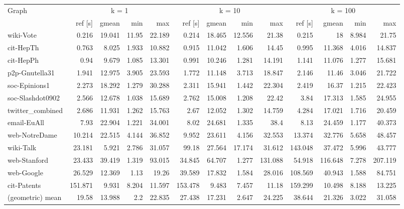 \begin{landscape}

\begin{table}[h]
\centering
\begin{tabular}{l|rrrr|rrrr|rrrr}
\toprule
Graph & \multicolumn{4}{c|}{k = 1} & \multicolumn{4}{c|}{k = 10} & \multicolumn{4}{c}{k = 100}\\
                &     ref [s] &   gmean &   min &     max &     ref [s] &   gmean &   min &     max &     ref [s] &   gmean &   min &     max \\
\midrule \midrule
 wiki-Vote        &   0.216 &  19.041 & 11.95  & 22.189 &   0.214 &  18.465 & 12.556 &  21.38  &   0.215 &  18     & 8.984 &  21.75  \\
 cit-HepTh        &   0.763 &   8.025 &  1.933 & 10.882 &   0.915 &  11.042 &  1.606 &  14.45  &   0.995 &  11.368 & 4.016 &  14.837 \\
 cit-HepPh        &   0.94  &   9.679 &  1.085 & 13.301 &   0.991 &  10.246 &  1.281 &  14.191 &   1.141 &  11.076 & 1.277 &  15.681 \\
 p2p-Gnutella31   &   1.941 &  12.975 &  3.905 & 23.593 &   1.772 &  11.148 &  3.713 &  18.847 &   2.146 &  11.46  & 3.046 &  21.722 \\
 soc-Epinions1    &   2.273 &  18.292 &  1.279 & 30.288 &   2.311 &  15.941 &  1.442 &  22.304 &   2.419 &  16.37  & 1.215 &  22.423 \\
 soc-Slashdot0902 &   2.566 &  12.678 &  1.038 & 15.689 &   2.762 &  15.008 &  1.208 &  22.42  &   3.84  &  17.313 & 1.585 &  24.955 \\
 twitter\_combined &   2.686 &  11.931 &  1.262 & 15.763 &   2.67  &  12.052 &  1.302 &  14.759 &   4.284 &  17.021 & 1.716 &  20.459 \\
 email-EuAll      &   7.93  &  22.904 &  1.221 & 34.001 &   8.02  &  24.681 &  1.335 &  38.4   &   8.13  &  24.459 & 1.177 &  40.373 \\
 web-NotreDame    &  10.214 &  22.515 &  4.144 & 36.852 &   9.952 &  23.611 &  4.156 &  32.553 &  13.374 &  32.776 & 5.658 &  48.457 \\
 wiki-Talk        &  23.181 &   5.921 &  2.786 & 31.057 &  99.18  &  27.564 & 17.174 &  31.612 & 143.048 &  37.472 & 5.996 &  43.777 \\
 web-Stanford     &  23.433 &  39.419 &  1.319 & 93.015 &  34.845 &  64.707 &  1.277 & 131.088 &  54.918 & 116.648 & 7.278 & 207.119 \\
 web-Google       &  26.529 &  12.369 &  1.13  & 19.26  &  39.589 &  17.832 &  1.584 &  28.016 & 108.569 &  40.943 & 1.588 &  84.751 \\
 cit-Patents      & 151.871 &   9.931 &  8.204 & 11.597 & 153.478 &   9.483 &  7.457 &  11.18  & 159.299 &  10.498 & 8.188 &  13.225 \\ \midrule \midrule
 (geometric) mean &  19.58  &  13.988 &  2.2   & 22.835 &  27.438 &  17.231 &  2.647 &  24.225 &  38.644 &  21.326 & 3.022 &  31.058 \\
\bottomrule
\end{tabular}


\end{table}
\end{landscape}
